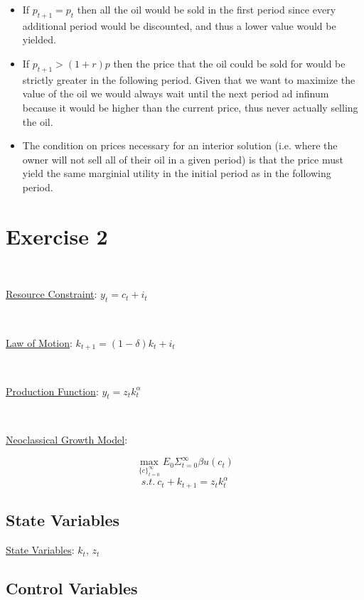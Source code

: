 \documentclass{article}
\begin{document}
\begin{itemize}

\item If $p_{t+1} = p_t$ then all the oil would be sold in the first period since every additional period would be discounted, and thus a lower value would be yielded.

\item If $p_{t+1}>(1+ r)p$ then the price that the oil could be sold for would be strictly greater in the following period. Given that we want to maximize the value of the oil we would always wait until the next period ad infinum because it would be higher than the current price, thus never actually selling the oil.

\item The condition on prices necessary for an interior solution (i.e. where the owner will not sell all of their oil in a given period) is that the price must yield the same marginial utility in the initial period as in the following period.

\end{itemize}

\section{Exercise 2}

\

\underline{Resource Constraint}: $y_t = c_t + i_t$

\

\underline{Law of Motion}: $k_{t+1} = (1-\delta)k_t + i_t$

\

\underline{Production Function}: $y_t = z_tk_t^\alpha$

\

\underline{Neoclassical Growth Model}:

\[ \max_{\{c\}_{t=0}^\infty} E_0 \Sigma_{t=0}^\infty \beta u(c_t)\]
\[ s.t. \ c_t + k_{t+1} = z_tk_t^\alpha\]


\subsection{State Variables}

\underline{State Variables}: $k_t$, $z_t$

\subsection{Control Variables}
\end{document}

